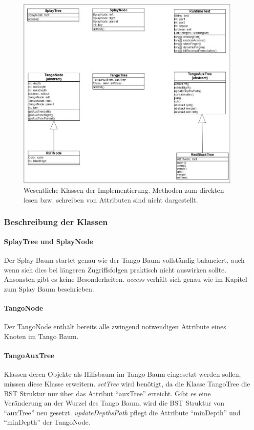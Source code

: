 \documentclass[a4paper,12pt]{article}
\begin{document}
\begin{figure}[H]
	\centering
	\includegraphics[width=1\textwidth]{"Medien/laufzeittest/klassen"}
	\caption{Wesentliche Klassen der Implementierung. Methoden zum direkten lesen bzw. schreiben von Attributen sind nicht dargestellt. }
	\label{fig:klassen}
\end{figure}

\subsubsection{Beschreibung der Klassen }

\paragraph{SplayTree und SplayNode}
Der Splay Baum startet genau wie der Tango Baum vollständig balanciert, auch wenn sich dies bei längeren Zugriffsfolgen praktisch nicht auswirken sollte. Ansonsten gibt es keine Besonderheiten. \textit{access} verhält sich genau wie im Kapitel zum Splay Baum beschrieben. 

\paragraph{TangoNode}
Der TangoNode enthält bereits alle zwingend notwendigen Attribute eines Knoten im Tango Baum. 

\paragraph{TangoAuxTree}
Klassen deren Objekte als Hilfsbaum im Tango Baum eingesetzt werden sollen, müssen diese Klasse erweitern. \textit{setTree} wird benötigt, da die Klasse TangoTree die BST Struktur nur über das Attribut \enquote{auxTree} erreicht. Gibt es eine Veränderung an der Wurzel des Tango Baum, wird die BST Struktur von \enquote{auxTree} neu gesetzt. \textit{updateDepthsPath} pflegt die Attribute \enquote{minDepth} und \enquote{minDepth} der TangoNode.
\end{document}
